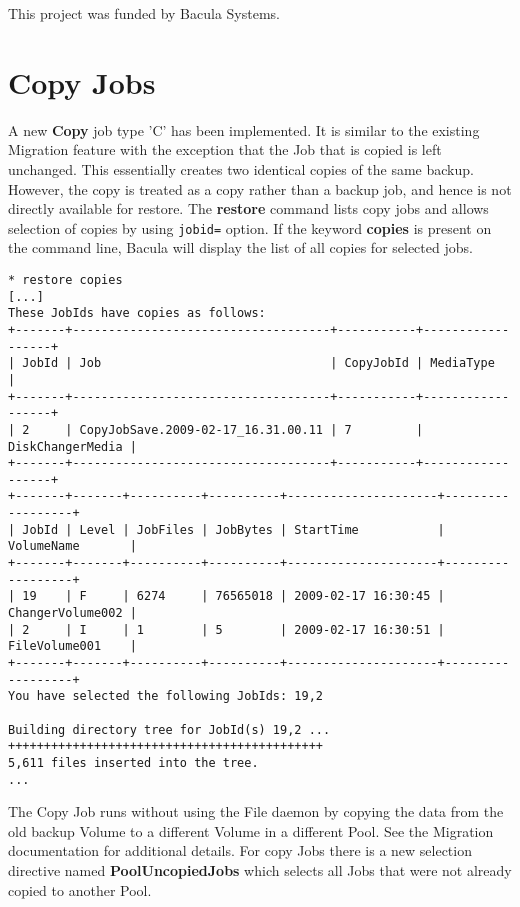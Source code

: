 This project was funded by Bacula Systems.
                                       


\section{Copy Jobs}

A new {\bf Copy} job type 'C' has been implemented. It is similar to the
existing Migration feature with the exception that the Job that is copied is
left unchanged.  This essentially creates two identical copies of the same
backup. However, the copy is treated as a copy rather than a backup job, and
hence is not directly available for restore.  The {\bf restore} command lists
copy jobs and allows selection of copies by using \texttt{jobid=}
option. If the keyword {\bf copies} is present on the command line, Bacula will
display the list of all copies for selected jobs.

\begin{verbatim}
* restore copies
[...]
These JobIds have copies as follows:
+-------+------------------------------------+-----------+------------------+
| JobId | Job                                | CopyJobId | MediaType        |
+-------+------------------------------------+-----------+------------------+
| 2     | CopyJobSave.2009-02-17_16.31.00.11 | 7         | DiskChangerMedia |
+-------+------------------------------------+-----------+------------------+
+-------+-------+----------+----------+---------------------+------------------+
| JobId | Level | JobFiles | JobBytes | StartTime           | VolumeName       |
+-------+-------+----------+----------+---------------------+------------------+
| 19    | F     | 6274     | 76565018 | 2009-02-17 16:30:45 | ChangerVolume002 |
| 2     | I     | 1        | 5        | 2009-02-17 16:30:51 | FileVolume001    |
+-------+-------+----------+----------+---------------------+------------------+
You have selected the following JobIds: 19,2

Building directory tree for JobId(s) 19,2 ...  ++++++++++++++++++++++++++++++++++++++++++++
5,611 files inserted into the tree.
...
\end{verbatim}


The Copy Job runs without using the File daemon by copying the data from the
old backup Volume to a different Volume in a different Pool. See the Migration
documentation for additional details. For copy Jobs there is a new selection
directive named {\bf PoolUncopiedJobs} which selects all Jobs that were
not already copied to another Pool. 

